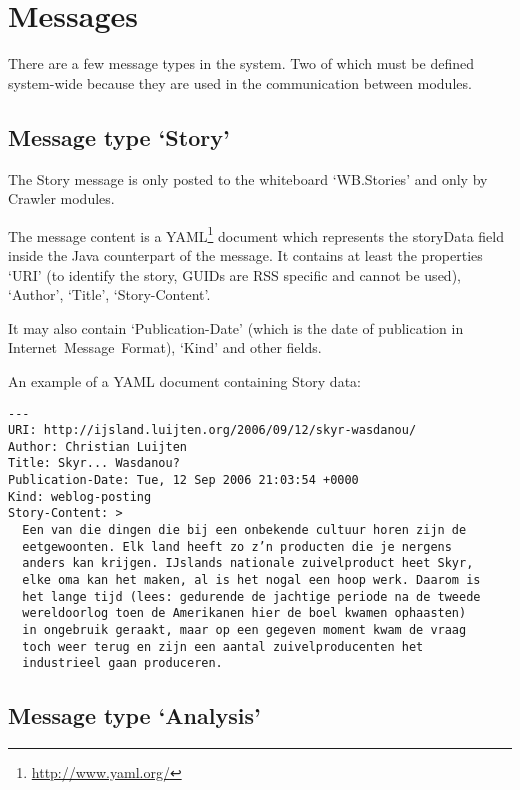 \section{\label{sct:messages}Messages}

There are a few message types in the system. Two of which must be defined
system-wide because they are used in the communication between modules.

\subsection{\label{sct:messages:story}Message type `Story'}

The Story message is only posted to the whiteboard `WB.Stories' and only by
Crawler modules.

The message content is a \ac{YAML}\footnote{\url{http://www.yaml.org/}} document
which represents the storyData field inside the Java counterpart of the
message. It contains at least the properties `URI' (to identify the story,
GUIDs are RSS specific and cannot be used), `Author', `Title', `Story-Content'.

It may also contain `Publication-Date' (which is the date of publication in
Internet~Message~Format\cite[Section~3.3]{RFC2822}), `Kind' and other fields.

An example of a YAML document containing Story data:

\begin{verbatim}
---
URI: http://ijsland.luijten.org/2006/09/12/skyr-wasdanou/
Author: Christian Luijten
Title: Skyr... Wasdanou?
Publication-Date: Tue, 12 Sep 2006 21:03:54 +0000
Kind: weblog-posting
Story-Content: >
  Een van die dingen die bij een onbekende cultuur horen zijn de
  eetgewoonten. Elk land heeft zo z’n producten die je nergens
  anders kan krijgen. IJslands nationale zuivelproduct heet Skyr,
  elke oma kan het maken, al is het nogal een hoop werk. Daarom is
  het lange tijd (lees: gedurende de jachtige periode na de tweede
  wereldoorlog toen de Amerikanen hier de boel kwamen ophaasten)
  in ongebruik geraakt, maar op een gegeven moment kwam de vraag
  toch weer terug en zijn een aantal zuivelproducenten het
  industrieel gaan produceren.
\end{verbatim}

\subsection{Message type `Analysis'}

